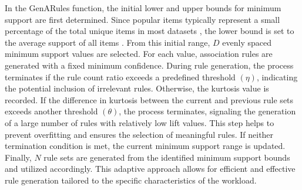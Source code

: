         In the GenARules function, the initial lower and upper bounds for minimum support are first determined. Since popular items typically represent a small percentage of the total unique items in most datasets \cite{bib:spmf}, the lower bound is set to the average support of all items \cite{bib:minsup}.  From this initial range, $D$ evenly spaced minimum support values are selected. For each value, association rules are generated with a fixed minimum confidence. During rule generation, the process terminates if the rule count ratio exceeds a predefined threshold $(\eta)$, indicating the potential inclusion of irrelevant rules. Otherwise, the kurtosis value is recorded. If the difference in kurtosis between the current and previous rule sets exceeds another threshold $(\theta)$, the process terminates, signaling the generation of a large number of rules with relatively low lift values.  This step helps to prevent overfitting and ensures the selection of meaningful rules. If neither termination condition is met, the current minimum support range is updated. Finally, $N$ rule sets are generated from the identified minimum support bounds and utilized accordingly. This adaptive approach allows for efficient and effective rule generation tailored to the specific characteristics of the workload.